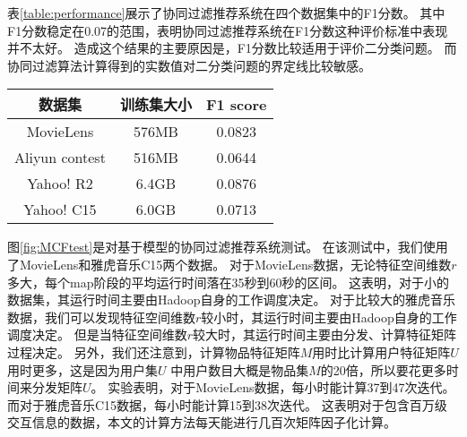 表\ref{table:performance}展示了协同过滤推荐系统在四个数据集中的F1分数。
其中F1分数稳定在0.07的范围，表明协同过滤推荐系统在F1分数这种评价标准中表现并不太好。
造成这个结果的主要原因是，F1分数比较适用于评价二分类问题。
而协同过滤算法计算得到的实数值对二分类问题的界定线比较敏感。
\begin{center}
\label{table:performance}
\begin{tabular}{c|c|c}
 \hline
数据集 & 训练集大小 & F1 score \\ \hline
MovieLens & 576MB & 0.0823 \\ \hline
Aliyun contest & 516MB & 0.0644 \\ \hline
Yahoo! R2 & 6.4GB & 0.0876 \\ \hline
Yahoo! C15 & 6.0GB & 0.0713 \\ \hline
\end{tabular}
\end{center}
\pgfplotsset{width=10cm,compat=1.13}
\begin{center}
\label{fig:MCFtest}
\end{center}

图\ref{fig:MCFtest}是对基于模型的协同过滤推荐系统测试。
在该测试中，我们使用了MovieLens和雅虎音乐C15两个数据。
对于MovieLens数据，无论特征空间维数$r$多大，每个map阶段的平均运行时间落在35秒到60秒的区间。
这表明，对于小的数据集，其运行时间主要由Hadoop自身的工作调度决定。
对于比较大的雅虎音乐数据，我们可以发现特征空间维数$r$较小时，其运行时间主要由Hadoop自身的工作调度决定。
但是当特征空间维数$r$较大时，其运行时间主要由分发、计算特征矩阵过程决定。
另外，我们还注意到，计算物品特征矩阵$M$用时比计算用户特征矩阵$U$用时更多，这是因为用户集$U$
中用户数目大概是物品集$M$的20倍，所以要花更多时间来分发矩阵$U$。
实验表明，对于MovieLens数据，每小时能计算37到47次迭代。而对于雅虎音乐C15数据，每小时能计算15到38次迭代。
这表明对于包含百万级交互信息的数据，本文的计算方法每天能进行几百次矩阵因子化计算。

